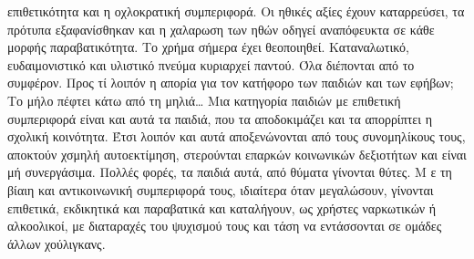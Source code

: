 \documentclass[12pt,a4paper]{book}
\begin{document}
επιθετικότητα και η οχλοκρατική συμπεριφορά. Οι ηθικές αξίες έχουν καταρρεύσει,
τα πρότυπα εξαφανίσθηκαν και η χαλαρωση των ηθών οδηγεί αναπόφευκτα σε κάθε
μορφής παραβατικότητα.
\newline\setlength{\parindent}{20pt}\indent Το χρήμα σήμερα έχει θεοποιηθεί.
Καταναλωτικό, ευδαιμονιστικό και υλιστικό πνεύμα κυριαρχεί παντού. Όλα
διέπονται από το συμφέρον. Προς τί λοιπόν η απορία για τον κατήφορο των παιδιών
και των εφήβων; Το μήλο πέφτει κάτω από τη μηλιά\ldots
\newline\setlength{\parindent}{20pt}\indent Μια κατηγορία παιδιών με επιθετική
συμπεριφορά είναι και αυτά τα παιδιά, που τα αποδοκιμάζει και τα απορρίπτει η
σχολική κοινότητα. Έτσι λοιπόν και αυτά αποξενώνονται από τους συνομηλίκους
τους, αποκτούν χσμηλή αυτοεκτίμηση, στερούνται επαρκών κοινωνικών δεξιοτήτων και
είναι μή συνεργάσιμα. Πολλές φορές, τα παιδιά αυτά, από θύματα γίνονται θύτες. Μ
ε τη βίαιη και αντικοινωνική συμπεριφορά τους, ιδιαίτερα όταν μεγαλώσουν,
γίνονται επιθετικά, εκδικητικά και παραβατικά και καταλήγουν, ως χρήστες
ναρκωτικών ή αλκοολικοί, με διαταραχές του ψυχισμού τους και τάση να
εντάσσονται σε ομάδες άλλων χούλιγκανς.
\end{document}
